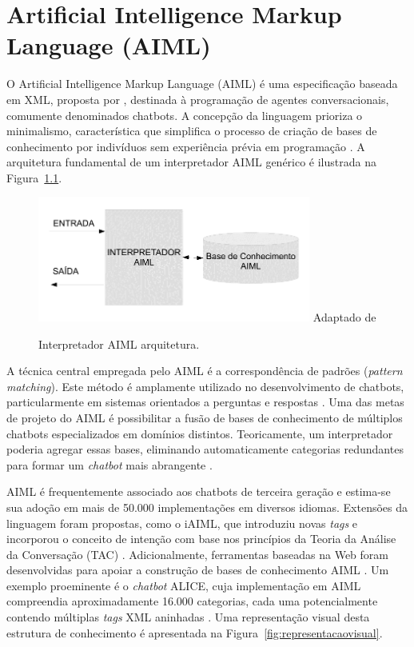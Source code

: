\documentclass[a4paper,oneside]{book}
\begin{document}
\chapter{Artificial Intelligence Markup
Language (AIML)}

O Artificial Intelligence Markup Language (AIML) é uma especificação baseada em XML, proposta por \cite{Wallace2009}, destinada à programação de agentes conversacionais, comumente denominados chatbots. A concepção da linguagem prioriza o minimalismo, característica que simplifica o processo de criação de bases de conhecimento por indivíduos sem experiência prévia em programação \cite{Wallace2009}. A arquitetura fundamental de um interpretador AIML genérico é ilustrada na Figura~\ref{fig:interpretador}.

\begin{figure}
    \centering
    \caption{Interpretador AIML arquitetura.}
    \includegraphics[width=0.8\textwidth]{./04-figuras/image8} %
    \label{fig:interpretador}
    \vspace{0.2cm} %
    {\footnotesize Adaptado de \cite{Silva2007}}
\end{figure}

A técnica central empregada pelo AIML é a correspondência de padrões (\emph{pattern matching}). Este método é amplamente utilizado no desenvolvimento de chatbots, particularmente em sistemas orientados a perguntas e respostas \cite{Abdul-Kader2015}. Uma das metas de projeto do AIML é possibilitar a fusão de bases de conhecimento de múltiplos chatbots especializados em domínios distintos. Teoricamente, um interpretador poderia agregar essas bases, eliminando automaticamente categorias redundantes para formar um \emph{chatbot} mais abrangente \cite{Wallace2000}.

AIML é frequentemente associado aos chatbots de terceira geração \cite{Maria2010} e estima-se sua adoção em mais de 50.000 implementações em diversos idiomas. Extensões da linguagem foram propostas, como o iAIML, que introduziu novas \emph{tags} e incorporou o conceito de intenção com base nos princípios da Teoria da Análise da Conversação (TAC) \cite{Neves2005}. Adicionalmente, ferramentas baseadas na Web foram desenvolvidas para apoiar a construção de bases de conhecimento AIML \cite{Krassmann2017}. Um exemplo proeminente é o \emph{chatbot} ALICE, cuja implementação em AIML compreendia aproximadamente 16.000 categorias, cada uma potencialmente contendo múltiplas \emph{tags} XML aninhadas \cite{Wallace2000}. Uma representação visual desta estrutura de conhecimento é apresentada na Figura~\ref{fig:representacaovisual}.
\end{document}
